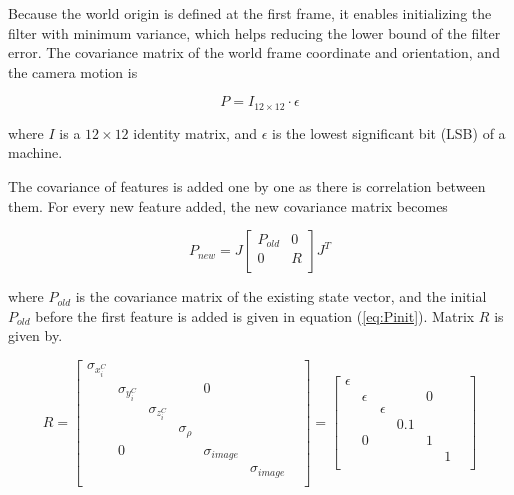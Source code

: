 Because the world origin is defined at the first frame, it enables 
initializing the filter with minimum variance, which helps reducing the 
lower bound of the filter error. The covariance matrix of the world frame
coordinate and orientation, and the camera motion is 

\begin{equation}
\label{eq:Pinit}
P=I_{12\times 12}\cdot \epsilon 
\end{equation}

\noindent where $I$ is a $12\times12$ identity matrix, and $\epsilon $ is the 
lowest significant bit (LSB) of a machine.

The covariance of features is added one by one as there is 
correlation between them. For every new feature added, the new 
covariance matrix becomes

\begin{equation}
\label{eq:Pnew}
P_{new}=J\begin{bmatrix}
P_{old} & 0 \\
0 & R \\
\end{bmatrix}
J^{T}
\end{equation}

\noindent where $P_{old}$ is the covariance matrix of the existing state vector, 
and the initial $P_{old}$ before the first feature is added is given
in equation (\ref{eq:Pinit}). Matrix $R$ is given by.

\begin{equation}
\label{eq:R}
R=\begin{bmatrix}
\sigma _{x_{i}^{C}} & & & & & & \\
 & \sigma _{y_{i}^{C}} & & & 0 & & \\
 & & \sigma _{z_{i}^{C}} & & & & \\
 & & & \sigma _{\rho } & & & \\
 & 0 & & & \sigma _{image} & & \\
 & & & & & \sigma _{image} & \\
\end{bmatrix}
 = \begin{bmatrix}
\epsilon & & & & & & \\
 & \epsilon & & & 0 & & \\
 & & \epsilon & & & & \\
 & & & 0.1 & & & \\
 & 0 & & & 1 & & \\
 & & & & & 1 & \\
\end{bmatrix} 
\end{equation}

